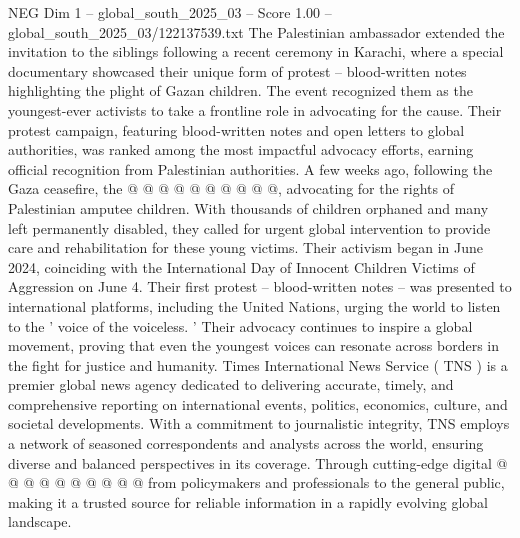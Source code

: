 \begin{textsample}{NEG Dim 1 – global\_south\_2025\_03 – Score 1.00 – global\_south\_2025\_03/122137539.txt}
The Palestinian ambassador extended the invitation to the siblings following a recent ceremony in Karachi, where a special documentary showcased their unique form of protest -- blood-written notes highlighting the plight of Gazan children.
The event recognized them as the youngest-ever activists to take a frontline role in advocating for the cause.
Their protest campaign, featuring blood-written notes and open letters to global authorities, was ranked among the most impactful advocacy efforts, earning official recognition from Palestinian authorities.
A few weeks ago, following the Gaza ceasefire, the @ @ @ @ @ @ @ @ @ @, advocating for the rights of Palestinian amputee children.
With thousands of children orphaned and many left permanently disabled, they called for urgent global intervention to provide care and rehabilitation for these young victims.
Their activism began in June 2024, coinciding with the International Day of Innocent Children Victims of Aggression on June 4.
Their first protest -- blood-written notes -- was presented to international platforms, including the United Nations, urging the world to listen to the ' voice of the voiceless. ' Their advocacy continues to inspire a global movement, proving that even the youngest voices can resonate across borders in the fight for justice and humanity.
Times International News Service ( TNS ) is a premier global news agency dedicated to delivering accurate, timely, and comprehensive reporting on international events, politics, economics, culture, and societal developments.
With a commitment to journalistic integrity, TNS employs a network of seasoned correspondents and analysts across the world, ensuring diverse and balanced perspectives in its coverage.
Through cutting-edge digital @ @ @ @ @ @ @ @ @ @ from policymakers and professionals to the general public, making it a trusted source for reliable information in a rapidly evolving global landscape.

\end{textsample}
